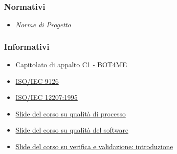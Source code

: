 \subsubsection{Normativi}
\begin{itemize}
	\item \emph{Norme di Progetto}
\end{itemize}

\subsubsection{Informativi}
\begin{itemize}
	\item \href{https://www.math.unipd.it/~tullio/IS-1/2021/Progetto/C1.pdf}{\color{blue} Capitolato di appalto C1 - BOT4ME}
 	\item \href{https://it.wikipedia.org/wiki/ISO/IEC_9126}{\color{blue} ISO/IEC 9126}
  	\item \href{https://www.math.unipd.it/~tullio/IS-1/2009/Approfondimenti/ISO_12207-1995.pdf}{\color{blue} ISO/IEC 12207:1995}
   	\item \href{https://www.math.unipd.it/~tullio/IS-1/2021/Dispense/T13.pdf}{\color{blue} Slide del corso su qualità di processo}
    \item \href{https://www.math.unipd.it/~tullio/IS-1/2021/Dispense/T12.pdf}{\color{blue} Slide del corso su qualità del software}
    \item \href{https://www.math.unipd.it/~tullio/IS-1/2021/Dispense/T14.pdf}{\color{blue} Slide del corso su verifica e validazione: introduzione}
\end{itemize}
\newpage